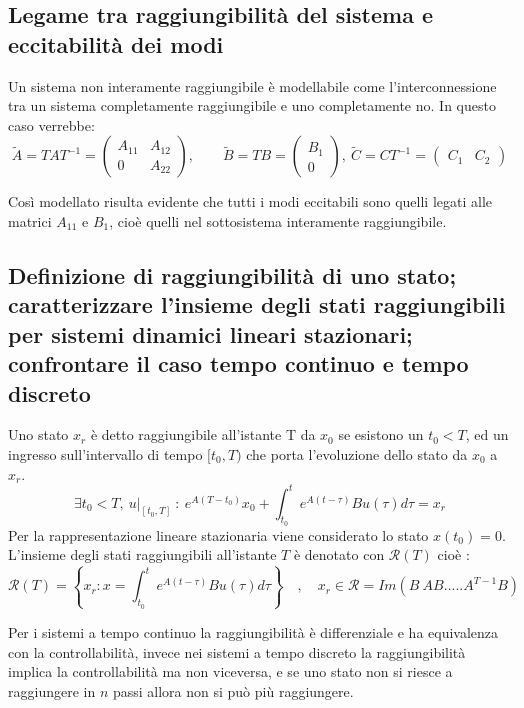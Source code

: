 \documentclass{article}
\begin{document}
\subsection{Legame tra raggiungibilità del sistema e eccitabilità dei modi}

Un sistema non interamente raggiungibile è modellabile come l'interconnessione tra un sistema
completamente raggiungibile e uno completamente no.
In questo caso verrebbe: 
\[
\widetilde{A} = TAT^{-1}= \begin{pmatrix}
A_{11} & A_{12}\\
0 & A_{22}
\end{pmatrix}
,
\hspace{2em}
\widetilde{B} = TB = \begin{pmatrix}
B_1\\
0
\end{pmatrix},\ 
\widetilde{C}= CT^{-1} = \begin{pmatrix}
C_1 & C_2
\end{pmatrix}
\]

Così modellato risulta evidente che tutti i modi eccitabili sono quelli legati alle matrici $A_{11}$ e $B_1$,
cioè quelli nel sottosistema interamente raggiungibile.



\subsection{Definizione di raggiungibilità di uno stato; caratterizzare l'insieme degli stati raggiungibili per sistemi dinamici lineari stazionari; confrontare il caso tempo continuo e tempo discreto}
Uno stato $x_r$ è detto raggiungibile all'istante T da $x_0$ se esistono un $t_0<T$, ed un ingresso sull'intervallo di tempo $[t_0,T)$
che porta l'evoluzione dello stato da $x_0$ a $x_r$.
\[ \exists t_0 < T,\ \left.u\right|_{[t_0,T]}\ :\ e^{A(T-t_0)}x_0+ \int_{t_0}^{t} e^{A(t-\tau)}Bu(\tau) d\tau = x_r \]
Per la rappresentazione lineare stazionaria viene considerato lo stato $x(t_0)=0$. 
L'insieme degli stati raggiungibili all'istante $T$ è denotato con $\mathcal{R}(T)$ cioè :
\[\mathcal{R}(T)=\left\{ x_r : x= \int_{t_0}^{t} e^{A(t-\tau)}Bu(\tau)d\tau\right\}
\quad, \quad
x_r \in \mathcal{R}=Im(B\ AB ..... A^{T-1}B)  \]

Per i sistemi a tempo continuo la raggiungibilità è differenziale e ha equivalenza con la controllabilità,
invece nei sistemi a tempo discreto la raggiungibilità implica la controllabilità ma non viceversa,
e se uno stato non si riesce a raggiungere in $n$ passi allora non si può più raggiungere.
\end{document}
